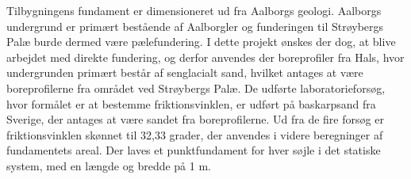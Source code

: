  \newline \indent{     }  Tilbygningens fundament er dimensioneret ud fra Aalborgs geologi. Aalborgs undergrund er primært bestående af Aalborgler og funderingen til Strøybergs Palæ burde dermed være pælefundering. I dette projekt ønskes der dog, at blive arbejdet med direkte fundering, og derfor anvendes der boreprofiler fra Hals, hvor undergrunden primært består af senglacialt sand, hvilket antages at være boreprofilerne fra området ved Strøybergs Palæ.
 \newline \indent{     }  De udførte laboratorieforsøg, hvor formålet er at bestemme friktionsvinklen, er udført på baskarpsand fra Sverige, der antages at være sandet fra boreprofilerne. Ud fra de fire forsøg er friktionsvinklen skønnet til 32,33 grader, der anvendes i videre beregninger af fundamentets areal. Der laves et punktfundament for hver søjle i det statiske system, med en længde og bredde på 1 m.
